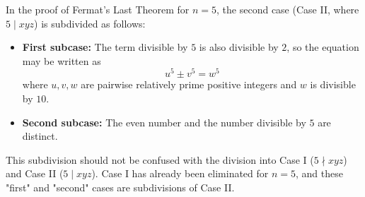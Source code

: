 In the proof of Fermat's Last Theorem for $n = 5$, the second case (Case II, where $5 \mid xyz$) is subdivided as follows:
\begin{itemize}
\item \textbf{First subcase:} The term divisible by $5$ is also divisible by $2$, so the equation may be written as
$$u^5 \pm v^5 = w^5$$
where $u, v, w$ are pairwise relatively prime positive integers and $w$ is divisible by $10$.
\item \textbf{Second subcase:} The even number and the number divisible by $5$ are distinct.
\end{itemize}
This subdivision should not be confused with the division into Case I ($5 \nmid xyz$) and Case II ($5 \mid xyz$). Case I has already been eliminated for $n = 5$, and these "first" and "second" cases are subdivisions of Case II.
